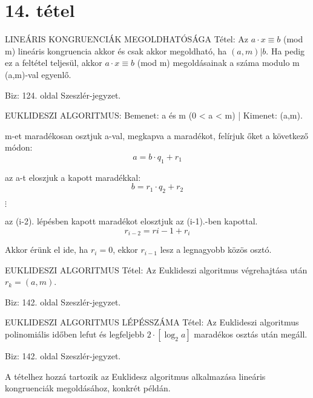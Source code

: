 \section{14. tétel}

\begin{framed}
LINEÁRIS KONGRUENCIÁK MEGOLDHATÓSÁGA Tétel: Az $a \cdot x \equiv b$ (mod m) lineáris kongruencia akkor és csak akkor megoldható, ha $(a,m)|b$. Ha pedig ez a feltétel teljesül, akkor  $a \cdot x \equiv b$ (mod m) megoldásainak a száma modulo m (a,m)-val egyenlő.
\end{framed}
\begin{leftbar}
Biz: 124. oldal Szeszlér-jegyzet.
\end{leftbar}
\begin{framed}
EUKLIDESZI ALGORITMUS: Bemenet: a és m (0 < a < m) | Kimenet: (a,m).
\begin{description}
\item[1. lépés:]m-et maradékosan osztjuk a-val, megkapva a maradékot, felírjuk őket a következő módon:
$$a = b\cdot q_1 + r_1$$
\item[2. lépés:]az a-t eloszjuk a kapott maradékkal:
$$b = r_1\cdot q_2 + r_2$$
\item $\vdots$
\item[i. lépés:] az (i-2). lépésben kapott maradékot elosztjuk az (i-1).-ben kapottal.
$$r_{i-2} = r{i-1} + r_i$$
\item[Utolsó lépés] Akkor érünk el ide, ha $r_i = 0$, ekkor $r_{i-1}$ lesz a legnagyobb közös osztó.
\end{description}
\end{framed}
\begin{framed}
EUKLIDESZI ALGORITMUS Tétel: Az Euklideszi algoritmus végrehajtása után $r_k = (a,m)$.
\end{framed}
\begin{leftbar}
Biz: 142. oldal Szeszlér-jegyzet.
\end{leftbar}
\begin{framed}
EUKLIDESZI ALGORITMUS LÉPÉSSZÁMA Tétel: Az Euklideszi algoritmus polinomiális időben lefut és legfeljebb $2 \cdot [\log_2a]$ maradékos osztás után megáll.
\end{framed}
\begin{leftbar}
Biz: 142. oldal Szeszlér-jegyzet.
\end{leftbar}
A tételhez hozzá tartozik az Euklidesz algoritmus alkalmazása lineáris kongruenciák megoldásához, konkrét példán.
